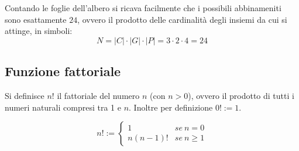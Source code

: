 \documentclass{article}     %
\begin{document}
\begin{ex}
            
            Contando le foglie dell'albero si ricava facilmente che i possibili abbinameniti sono esattamente $24$, ovvero il prodotto delle cardinalità degli insiemi da cui si attinge, in simboli:
            \[N=|C|\cdot|G|\cdot|P|=3\cdot2\cdot4=24\]
        \end{ex}
        \subsection{Funzione fattoriale}
            \begin{boxdef}
                Si definisce $n!$ il fattoriale del numero $n$ (con $n>0$), ovvero il prodotto di tutti i numeri naturali compresi tra 1 e $n$. Inoltre per definizione $0!:=1$.
            \end{boxdef}
            \[n!:=\left\{\begin{array}{cc}
                 1  & se ~n=0\\
                 n(n-1)! & se ~n\geq 1
            \end{array}\right.\]
            
\end{document}

